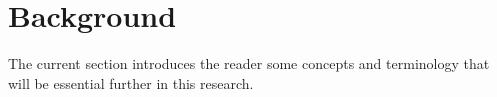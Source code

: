 \section{Background} \label{background}

The current section introduces the reader some concepts and terminology that will be essential further in this research.




